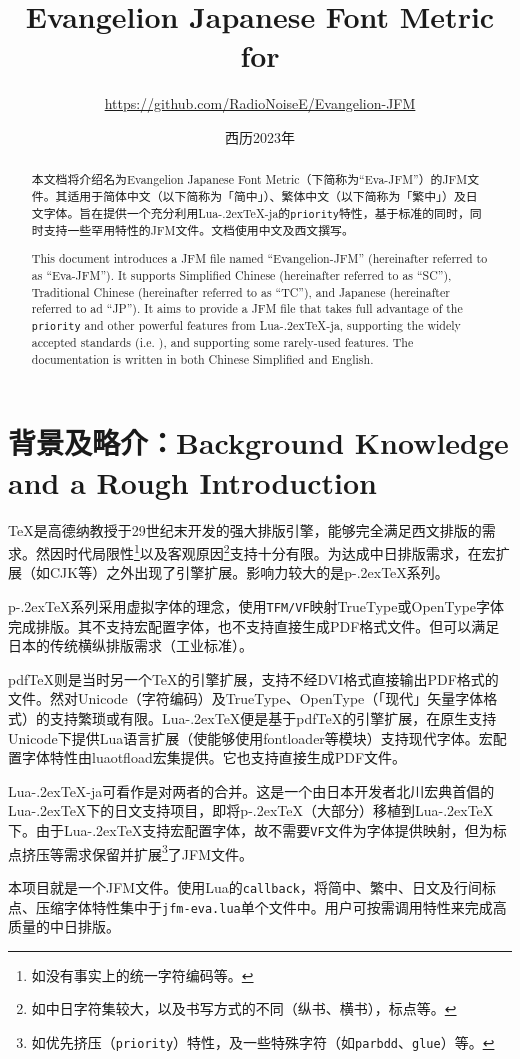 \documentclass{ltjsarticle}
\title{\sffamily\bfseries Evangelion Japanese Font Metric for \LuaTeX}
\author{\large \url{https://github.com/RadioNoiseE/Evangelion-JFM}}
\date{西历2023年}
\def\段{\par}
\def\LuaTeX{Lua\kern-.2ex\TeX}
\def\pTeX{p\kern-.2ex\TeX}
\def\pdfTeX{pdf\TeX}
\begin{document}
\zw\parskip=2pt

\maketitle

\begin{abstract}
    本文档将介绍名为Evangelion Japanese Font Metric（下简称为``\textsf{Eva-JFM}''）的JFM文件。其适用于简体中文（以下简称为「简中」）、繁体中文（以下简称为「繁中」）及日文字体。旨在提供一个充分利用\LuaTeX{}-ja的\texttt{priority}特性，基于标准\cite{jlreq}的同时，同时支持一些罕用特性的JFM文件。文档使用中文及西文撰写。\段
    This document introduces a JFM file named ``Evangelion-JFM'' (hereinafter referred to as ``\textsf{Eva-JFM}''). It supports Simplified Chinese (hereinafter referred to as ``SC''), Traditional Chinese (hereinafter referred to as ``TC''), and Japanese (hereinafter referred to ad ``JP''). It aims to provide a JFM file that takes full advantage of the \texttt{priority} and other powerful features from \LuaTeX{}-ja, supporting the widely accepted standards (i.e. \cite{jlreq}), and supporting some rarely-used features. The documentation is written in both Chinese Simplified and English.
\end{abstract}

\section{背景及略介：Background Knowledge and a Rough Introduction}
\TeX{}是高德纳教授于29世纪末开发的强大排版引擎，能够完全满足西文排版的需求。然因时代局限性\footnote{如没有事实上的统一字符编码等。}以及客观原因\footnote{如中日字符集较大，以及书写方式的不同（纵书、横书），标点等。}支持十分有限。为达成中日排版需求，在宏扩展（如\textsf{CJK}等）之外出现了引擎扩展。影响力较大的是\pTeX{}系列。\段
\pTeX{}系列采用虚拟字体的理念，使用\texttt{TFM/VF}映射TrueType或OpenType字体完成排版。其不支持宏配置字体，也不支持直接生成PDF格式文件。但可以满足日本的传统横纵排版需求（工业标准）。\段
\pdfTeX{}则是当时另一个\TeX{}的引擎扩展，支持不经DVI格式直接输出PDF格式的文件。然对Unicode（字符编码）及TrueType、OpenType（「现代」矢量字体格式）的支持繁琐或有限。\LuaTeX{}便是基于\pdfTeX{}的引擎扩展，在原生支持Unicode下提供Lua语言扩展（使能够使用\textsf{fontloader}等模块）支持现代字体。宏配置字体特性由\textsf{luaotfload}宏集提供。它也支持直接生成PDF文件。\段
\LuaTeX{}-ja可看作是对两者的合并。这是一个由日本开发者北川宏典首倡的\LuaTeX{}下的日文支持项目，即将\pTeX{}（大部分）移植到\LuaTeX{}下。由于\LuaTeX{}支持宏配置字体，故不需要\texttt{VF}文件为字体提供映射，但为标点挤压等需求保留并扩展\footnote{如优先挤压（\texttt{priority}）特性，及一些特殊字符（如\texttt{parbdd}、\texttt{glue}）等。}了JFM文件。\段
本项目就是一个JFM文件。使用Lua的\texttt{callback}，将简中、繁中、日文及行间标点、压缩字体特性集中于\texttt{jfm-eva.lua}单个文件中。用户可按需调用特性来完成高质量的中日排版。
\end{document}
